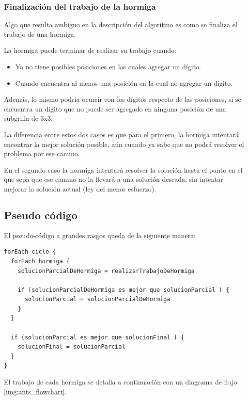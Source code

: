 \documentclass[a4paper,spanish]{article}
\begin{document}
\subsubsection{Finalización del trabajo de la hormiga}

Algo que resulta ambiguo en la descripción del algoritmo es como se finaliza el trabajo de una hormiga.

La hormiga puede terminar de realizar su trabajo cuando:

\begin{itemize}
	\item Ya no tiene posibles posiciones en las cuales agregar un dígito.
	\item Cuando encuentra al menos una posición en la cual no agregar un dígito.
\end{itemize}
 
Además, lo mismo podría ocurrir con los dígitos respecto de las posiciones, si se encuentra un dígito
que no puede ser agregado en ninguna posición de una subgrilla de 3x3.

La diferencia entre estos dos casos es que para el primero, la hormiga intentará encontrar la mejor
solución posible, aún cuando ya sabe que no podrá resolver el problema por ese camino.

En el segundo caso la hormiga intentará resolver la solución hasta el punto en el que sepa que ese
camino no la llevará a una solución deseada, sin intentar mejorar la solución actual (ley del menor esfuerzo).

\subsection{Pseudo código}

El pseudo-código a grandes rasgos queda de la siguiente manera:

\begin{Verbatim}[samepage=true]
forEach ciclo {
  forEach hormiga {
    solucionParcialDeHormiga = realizarTrabajoDeHormiga
    
    if (solucionParcialDeHormiga es mejor que solucionParcial ) {
      solucionParcial = solucionParcialDeHormiga
    }
  }
  
  if (solucionParcial es mejor que solucionFinal ) {
    solucionFinal = solucionParcial
  }
}
\end{Verbatim}

El trabajo de cada hormiga se detalla a continuación con un diagrama de flujo \ref{img:ants_flowchart}.
\end{document}
